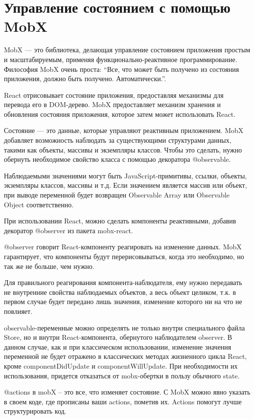 \documentclass[12pt, a4paper]{diplom}
\begin{document}
\section{Управление состоянием с помощью MobX}

MobX\cite{MobX} — это библиотека, делающая управление состоянием приложения простым и масштабируемым, применяя функционально-реактивное программирование. Философия MobX очень проста:
“Все, что может быть получено из состояния приложения, должно быть получено. Автоматически.”.

React отрисовывает состояние приложения, предоставляя механизмы для перевода его в DOM-дерево. MobX предоставляет механизм хранения и обновления состояния приложения, которое затем может использовать React.

Состояние — это данные, которые управляют реактивным приложением.
MobX добавляет возможность наблюдать за существующими структурами данных, такими как объекты, массивы и экземпляры классов. Чтобы это сделать, нужно обернуть необходимое свойство класса с помощью декоратора @observable.

Наблюдаемыми значениями могут быть JavaScript-примитивы, ссылки, объекты, экземпляры классов, массивы и т.д. Если значением является массив или объект, при выводе переменной будет возвращен Observable Array или Observable Object соответственно.

При использовании React, можно сделать компоненты реактивными, добавив декоратор @observer из пакета mobx-react.

@observer говорит React-компоненту реагировать на изменение данных. MobX гарантирует, что компоненты будут перерисовываться, когда это необходимо, но так же не больше, чем нужно.

Для правильного реагирования компонента-наблюдателя, ему нужно передавать не внутренние свойства наблюдаемых объектов, а весь объект целиком, т.к. в первом случае будет передано лишь значения, изменение которого ни на что не повлияет.

observable-переменные можно определять не только внутри специального файла Store, но и внутри React-компонента, обернутого наблюдателем observer. В данном случае, как и при классическом использовании, изменение значения переменной не будет отражено в классических методах жизненного цикла React, кроме componentDidUpdate и componentWillUpdate. При необходимости их использования, придется отказаться от mobx-обертки в пользу обычного state.

@actions в mobX -- это все, что изменяет состояние. С MobX можно явно указать в своем коде, где прописаны ваши actions, пометив их. Actions помогут лучше структурировать код.
\end{document}
